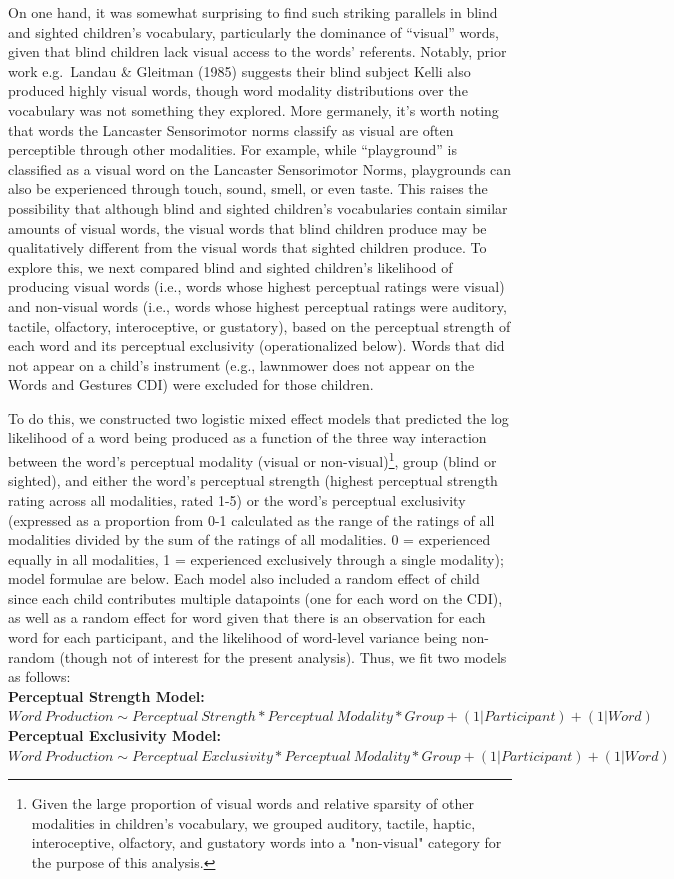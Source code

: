 \documentclass[
  man,floatsintext]{apa6}
\begin{document}
On one hand, it was somewhat surprising to find such striking parallels in blind and sighted children's vocabulary, particularly the dominance of ``visual'' words, given that blind children lack visual access to the words' referents. Notably, prior work e.g.~Landau \& Gleitman (1985) suggests their blind subject Kelli also produced highly visual words, though word modality distributions over the vocabulary was not something they explored. More germanely, it's worth noting that words the Lancaster Sensorimotor norms classify as visual are often perceptible through other modalities. For example, while ``playground'' is classified as a visual word on the Lancaster Sensorimotor Norms, playgrounds can also be experienced through touch, sound, smell, or even taste. This raises the possibility that although blind and sighted children's vocabularies contain similar amounts of visual words, the visual words that blind children produce may be qualitatively different from the visual words that sighted children produce. To explore this, we next compared blind and sighted children's likelihood of producing visual words (i.e., words whose highest perceptual ratings were visual) and non-visual words (i.e., words whose highest perceptual ratings were auditory, tactile, olfactory, interoceptive, or gustatory), based on the perceptual strength of each word and its perceptual exclusivity (operationalized below). Words that did not appear on a child's instrument (e.g., lawnmower does not appear on the Words and Gestures CDI) were excluded for those children.

To do this, we constructed two logistic mixed effect models that predicted the log likelihood of a word being produced as a function of the three way interaction between the word's perceptual modality (visual or non-visual)\footnote{Given the large proportion of visual words and relative sparsity of other modalities in children's vocabulary, we grouped auditory, tactile, haptic, interoceptive, olfactory, and gustatory words into a "non-visual" category for the purpose of this analysis.}, group (blind or sighted), and either the word's perceptual strength (highest perceptual strength rating across all modalities, rated 1-5) or the word's perceptual exclusivity (expressed as a proportion from 0-1 calculated as the range of the ratings of all modalities divided by the sum of the ratings of all modalities. 0 = experienced equally in all modalities, 1 = experienced exclusively through a single modality); model formulae are below. Each model also included a random effect of child since each child contributes multiple datapoints (one for each word on the CDI), as well as a random effect for word given that there is an observation for each word for each participant, and the likelihood of word-level variance being non-random (though not of interest for the present analysis). Thus, we fit two models as follows:\\
\textbf{Perceptual Strength Model:} \(Word\ Production \sim Perceptual\ Strength * Perceptual\ Modality * Group + (1|Participant) + (1|Word)\)\\
\textbf{Perceptual Exclusivity Model:} \(Word\ Production \sim Perceptual\ Exclusivity * Perceptual\ Modality * Group + (1|Participant) + (1|Word)\)
\end{document}
